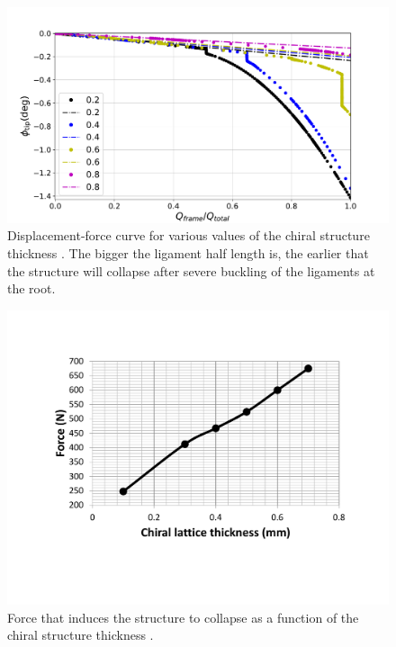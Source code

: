       \begin{figure}[!htpb] %
        \centering
        \includegraphics[width=0.8 \textwidth]{figures/../figures/result-sim/chiral_t/force_displacement-far}
        \caption[Displacement-force curve for various values of the chiral structure thickness]{Displacement-force curve for various values of the chiral structure thickness \chit. The bigger the ligament half length is, the earlier that the structure will collapse after severe buckling of the ligaments at the root.}\label{fig:forceDisplacement-far-chiral-t}
      \end{figure}

      \begin{figure}[!htpb] %
        \centering
        \includegraphics[width=0.8 \textwidth]{figures/../figures/result-sim/chiral_t/force_chiral_t}
        \caption[Force that induces the structure to collapse as a function of the chiral structure thickness]{Force that induces the structure to collapse as a function of the chiral structure thickness \chit.}\label{fig:force_chiral_t}
      \end{figure} 